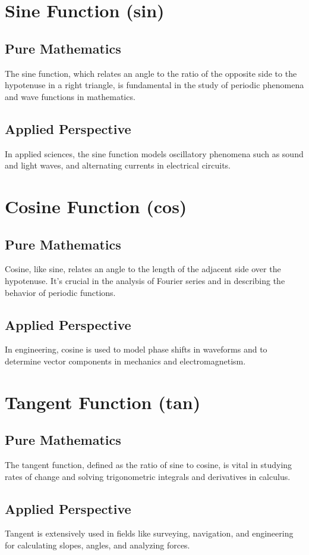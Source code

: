 \documentclass[a4paper,12pt]{book}
\begin{document}
\section*{Sine Function (sin)}
\subsection*{Pure Mathematics}
The sine function, which relates an angle to the ratio of the opposite side to the hypotenuse in a right triangle, is fundamental in the study of periodic phenomena and wave functions in mathematics.

\subsection*{Applied Perspective}
In applied sciences, the sine function models oscillatory phenomena such as sound and light waves, and alternating currents in electrical circuits.

\section*{Cosine Function (cos)}
\subsection*{Pure Mathematics}
Cosine, like sine, relates an angle to the length of the adjacent side over the hypotenuse. It's crucial in the analysis of Fourier series and in describing the behavior of periodic functions.

\subsection*{Applied Perspective}
In engineering, cosine is used to model phase shifts in waveforms and to determine vector components in mechanics and electromagnetism.

\section*{Tangent Function (tan)}
\subsection*{Pure Mathematics}
The tangent function, defined as the ratio of sine to cosine, is vital in studying rates of change and solving trigonometric integrals and derivatives in calculus.

\subsection*{Applied Perspective}
Tangent is extensively used in fields like surveying, navigation, and engineering for calculating slopes, angles, and analyzing forces.
\end{document}
